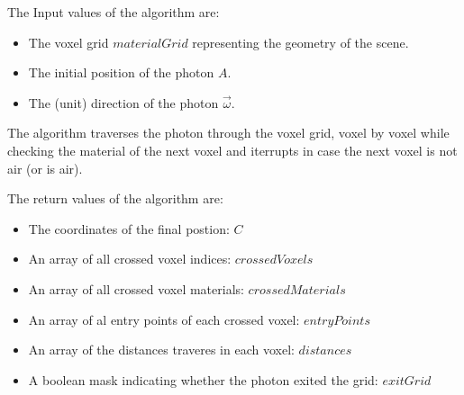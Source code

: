 The Input values of the algorithm are:
\begin{itemize}
    \item The voxel grid $materialGrid$ representing the geometry of the scene.
    \item The initial position of the photon $A$.
    \item The (unit) direction of the photon $\vec{\omega}$.
\end{itemize}

The algorithm traverses the photon through the voxel grid, voxel by voxel while checking the material of the next voxel and iterrupts in case the next voxel is not air (or is air).

The return values of the algorithm are:
\begin{itemize}
    \item The coordinates of the final postion: $C$
    \item An array of all crossed voxel indices: $crossedVoxels$
    \item An array of all crossed voxel materials: $crossedMaterials$
    \item An array of al entry points of each crossed voxel: $entryPoints$
    \item An array of the distances traveres in each voxel: $distances$
    \item A boolean mask indicating whether the photon exited the grid:
    $exitGrid$
\end{itemize}

